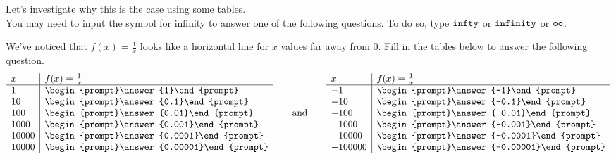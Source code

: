 \documentclass{ximera}
\begin{document}
Let's investigate why this is the case using some tables.  \\

You may need to input the symbol for infinity to answer one of the following questions.  To do so, type $\verb|infty|$ or $\verb|infinity|$ or $\verb|oo|$.  

\begin{problem}
We've noticed that $f(x) = \frac{1}{x}$ looks like a horizontal line for $x$ values far away from $0$.  Fill in the tables below to answer the following question. 
  \[
  \begin{array}{l|l}
    x      & f(x) = \frac{1}{x}     \\ \hline
    1    & \begin{prompt}\answer{1}\end{prompt}\\
    10   & \begin{prompt}\answer{0.1}\end{prompt}\\
    100  & \begin{prompt}\answer{0.01}\end{prompt}\\
    1000 & \begin{prompt}\answer{0.001}\end{prompt} \\
    10000 & \begin{prompt}\answer{0.0001}\end{prompt} \\
    10000 & \begin{prompt}\answer{0.00001}\end{prompt} \\
  \end{array}
  \qquad\text{and}\qquad
  \begin{array}{l|l}
     x      & f(x) = \frac{1}{x}     \\ \hline
    -1    & \begin{prompt}\answer{-1}\end{prompt}\\
    -10   & \begin{prompt}\answer{-0.1}\end{prompt}\\
    -100  & \begin{prompt}\answer{-0.01}\end{prompt}\\
    -1000 & \begin{prompt}\answer{-0.001}\end{prompt} \\
    -10000 & \begin{prompt}\answer{-0.0001}\end{prompt} \\
    -100000 & \begin{prompt}\answer{-0.00001}\end{prompt} \\
    \end{array}
  \]
  

\end{problem}
\end{document}
